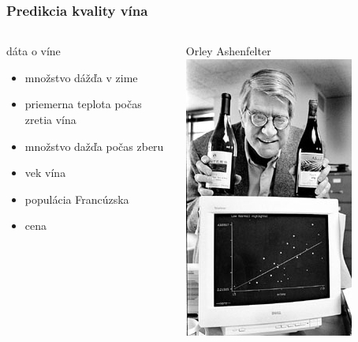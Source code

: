\documentclass[presentation.tex]{subfiles}
\begin{document}
	
	\begin{frame}
		\frametitle{Predikcia kvality vína}
		
		\begin{columns}
			\begin{column}{0.5\textwidth}
				dáta o víne
				\begin{itemize}
					\item množstvo dážďa v zime
					\item priemerna teplota počas zretia vína
					\item množstvo dažďa počas zberu
					\item vek vína
					\item populácia Francúzska
					\item cena 
				\end{itemize}
			\end{column}
			
			\begin{column}{0.5\textwidth}
				\centering
				Orley Ashenfelter 
				\includegraphics[width=0.5\linewidth]{Orley_Ashenfelter.jpg}
			\end{column}
			
		\end{columns}
		
	\end{frame}
\end{document}
